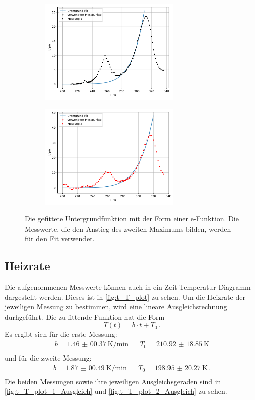   \begin{figure}[H]
    \begin{subfigure}[b]{.5\linewidth}
      \centering
      \includegraphics[height=5cm, keepaspectratio]{build/untergrund_1.pdf}
    \end{subfigure}
    \begin{subfigure}[b]{.5\linewidth}
      \centering
      \includegraphics[height=5cm, keepaspectratio]{build/untergrund_2.pdf}
    \end{subfigure}
    
    \caption{Die gefittete Untergrundfunktion mit der Form einer e-Funktion.
      Die Messwerte, die den Anstieg des zweiten Maximums bilden, werden für den Fit verwendet.}
    \label{fig:T_I_plot_Untergrund}
  \end{figure} %

\subsection{Heizrate}
  Die aufgenommenen Messwerte können auch in ein Zeit-Temperatur Diagramm dargestellt werden.
  Dieses ist in \autoref{fig:t_T_plot} zu sehen.
  Um die Heizrate der jeweiligen Messung zu bestimmen, wird eine lineare Ausgleichsrechnung durhgeführt.
  Die zu fittende Funktion hat die Form
  \begin{equation*}
    T(t) = b \cdot t + T_0 \, .
  \end{equation*}
  Es ergibt sich für die erste Messung:
  \begin{align*}
    b = \SI{1.46(0037)}{\kelvin\per\minute} &&  T_0 = \SI{210.92(1885)}{\kelvin}\\
  \end{align*}
  und für die zweite Messung:
  \begin{align*}
    b =  \SI{1.87(0049)}{\kelvin\per\minute}  &&  T_0 = \SI{198.95(2027)}{\kelvin} \, . \\
  \end{align*}
  Die beiden Messungen sowie ihre jeweiligen Ausgleichsgeraden sind in \autoref{fig:t_T_plot_1_Ausgleich} und \autoref{fig:t_T_plot_2_Ausgleich} zu sehen.

